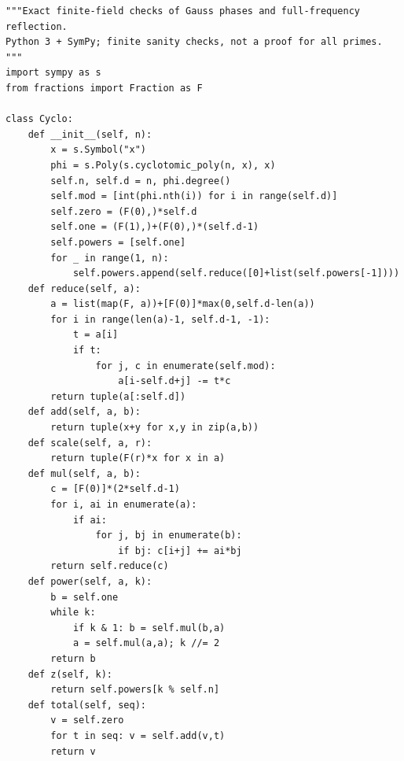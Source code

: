 \documentclass[12pt]{article}
\begin{document}
\begin{verbatim}
"""Exact finite-field checks of Gauss phases and full-frequency reflection.
Python 3 + SymPy; finite sanity checks, not a proof for all primes.
"""
import sympy as s
from fractions import Fraction as F

class Cyclo:
    def __init__(self, n):
        x = s.Symbol("x")
        phi = s.Poly(s.cyclotomic_poly(n, x), x)
        self.n, self.d = n, phi.degree()
        self.mod = [int(phi.nth(i)) for i in range(self.d)]
        self.zero = (F(0),)*self.d
        self.one = (F(1),)+(F(0),)*(self.d-1)
        self.powers = [self.one]
        for _ in range(1, n):
            self.powers.append(self.reduce([0]+list(self.powers[-1])))
    def reduce(self, a):
        a = list(map(F, a))+[F(0)]*max(0,self.d-len(a))
        for i in range(len(a)-1, self.d-1, -1):
            t = a[i]
            if t:
                for j, c in enumerate(self.mod):
                    a[i-self.d+j] -= t*c
        return tuple(a[:self.d])
    def add(self, a, b):
        return tuple(x+y for x,y in zip(a,b))
    def scale(self, a, r):
        return tuple(F(r)*x for x in a)
    def mul(self, a, b):
        c = [F(0)]*(2*self.d-1)
        for i, ai in enumerate(a):
            if ai:
                for j, bj in enumerate(b):
                    if bj: c[i+j] += ai*bj
        return self.reduce(c)
    def power(self, a, k):
        b = self.one
        while k:
            if k & 1: b = self.mul(b,a)
            a = self.mul(a,a); k //= 2
        return b
    def z(self, k):
        return self.powers[k % self.n]
    def total(self, seq):
        v = self.zero
        for t in seq: v = self.add(v,t)
        return v


\end{verbatim}
\end{document}
